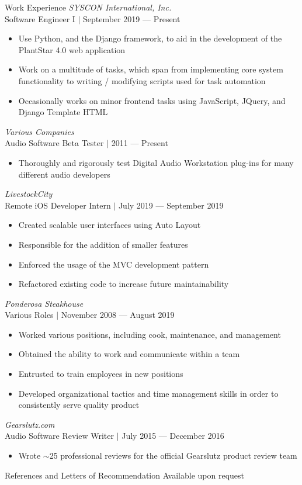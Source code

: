 \documentclass{Joseph_T_Lyons_Resume}
\newenvironment{tightlySpacedList}
{ \begin{itemize}
    \setlength{\itemsep}{0pt}
    \setlength{\parskip}{0pt}
    \setlength{\parsep}{0pt}     }
{ \end{itemize}                  }
\begin{document}
\begin{rSection}{Work Experience}
\textit{SYSCON International, Inc.}
\\Software Engineer I $\mid$ September 2019 --- Present
\begin{tightlySpacedList}
    \item Use Python, and the Django framework, to aid in the development of the
          PlantStar 4.0 web application
    \item Work on a multitude of tasks, which span from implementing core system
          functionality to writing / modifying scripts used for task automation
    \item Occasionally works on minor frontend tasks using JavaScript, JQuery,
          and Django Template HTML
\end{tightlySpacedList}

\textit{Various Companies}
\\Audio Software Beta Tester $\mid$ 2011 --- Present
\begin{tightlySpacedList}
    \item Thoroughly and rigorously test Digital Audio Workstation plug-ins for
     many different audio developers
\end{tightlySpacedList}

\textit{LivestockCity}
\\Remote iOS Developer Intern $\mid$ July 2019 --- September 2019
\begin{tightlySpacedList}
    \item Created scalable user interfaces using Auto Layout
    \item Responsible for the addition of smaller features
    \item Enforced the usage of the MVC development pattern
    \item Refactored existing code to increase future maintainability
\end{tightlySpacedList}

\textit{Ponderosa Steakhouse}
\\Various Roles $\mid$ November 2008 --- August 2019
\begin{tightlySpacedList}
    \item Worked various positions, including cook, maintenance, and management
    \item Obtained the ability to work and communicate within a team
    \item Entrusted to train employees in new positions
    \item Developed organizational tactics and time management skills in order
     to consistently serve quality product
\end{tightlySpacedList}

\textit{Gearslutz.com}
\\Audio Software Review Writer $\mid$ July 2015 --- December 2016
\begin{tightlySpacedList}
    \item Wrote $\sim$25 professional reviews for the official Gearslutz product
          review team
\end{tightlySpacedList}
\end{rSection}

\begin{rSection}{References and Letters of Recommendation}
Available upon request
\end{rSection}
\end{document}
